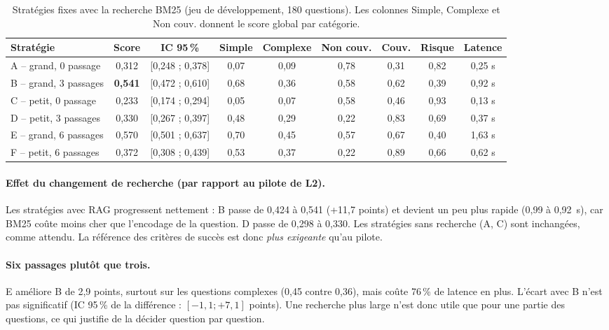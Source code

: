 \documentclass[11pt,a4paper]{article}
\begin{document}
\begin{table}[H]
\centering\footnotesize\setlength{\tabcolsep}{4pt}
\begin{tabular}{l c c c c c c c c}
\toprule
\textbf{Stratégie} & \textbf{Score} & \textbf{IC 95\,\%} & \textbf{Simple} & \textbf{Complexe} & \textbf{Non couv.} & \textbf{Couv.} & \textbf{Risque} & \textbf{Latence} \\
\midrule
A -- grand, 0 passage   & 0,312 & [0,248 ; 0,378] & 0,07 & 0,09 & 0,78 & 0,31 & 0,82 & 0,25 s \\
B -- grand, 3 passages  & \textbf{0,541} & [0,472 ; 0,610] & 0,68 & 0,36 & 0,58 & 0,62 & 0,39 & 0,92 s \\
C -- petit, 0 passage   & 0,233 & [0,174 ; 0,294] & 0,05 & 0,07 & 0,58 & 0,46 & 0,93 & 0,13 s \\
D -- petit, 3 passages  & 0,330 & [0,267 ; 0,397] & 0,48 & 0,29 & 0,22 & 0,83 & 0,69 & 0,37 s \\
E -- grand, 6 passages  & 0,570 & [0,501 ; 0,637] & 0,70 & 0,45 & 0,57 & 0,67 & 0,40 & 1,63 s \\
F -- petit, 6 passages  & 0,372 & [0,308 ; 0,439] & 0,53 & 0,37 & 0,22 & 0,89 & 0,66 & 0,62 s \\
\bottomrule
\end{tabular}
\caption{Stratégies fixes avec la recherche BM25 (jeu de développement, 180 questions). Les colonnes
Simple, Complexe et Non couv. donnent le score global par catégorie.}
\label{tab:strategies}
\end{table}

\paragraph{Effet du changement de recherche (par rapport au pilote de L2).} Les stratégies avec RAG
progressent nettement : B passe de 0,424 à 0,541 (+11,7 points) et devient un peu plus rapide (0,99 à
0,92~s), car BM25 coûte moins cher que l'encodage de la question. D passe de 0,298 à 0,330. Les
stratégies sans recherche (A, C) sont inchangées, comme attendu. La référence des critères de succès
est donc \emph{plus exigeante} qu'au pilote.

\paragraph{Six passages plutôt que trois.} E améliore B de 2,9 points, surtout sur les questions
complexes (0,45 contre 0,36), mais coûte 76\,\% de latence en plus. L'écart avec B n'est pas
significatif (IC 95\,\% de la différence : $[-1{,}1 ; +7{,}1]$ points). Une recherche plus large n'est
donc utile que pour une partie des questions, ce qui justifie de la décider question par question.
\end{document}

